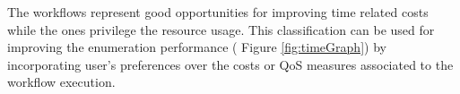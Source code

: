 The \maxpar{} workflows represent good opportunities for improving time related costs while the \parminus{} ones privilege the resource usage.
This classification can be used for improving the enumeration performance (\cf{} Figure \ref{fig:timeGraph}) by incorporating user's preferences over the costs or QoS measures associated to the workflow execution.

 

